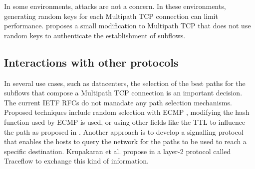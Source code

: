 In some environments, attacks are not a concern. In these environments, generating random keys for each Multipath TCP
connection can limit performance. \cite{draft-paasch-mptcp-lowoverhead} proposes a small modification to Multipath TCP that does not use random keys
to authenticate the establishment of subflows.


\subsection{Interactions with other protocols}

In several use cases, such as datacenters, the selection of the best paths for the subflows that compose a Multipath TCP connection is an important decision. The current IETF RFCs do not manadate any path selection mechanisms. Proposed techniques include random selection with ECMP \cite{Raiciu_Datacenter:2011}, modifying the hash function used by ECMP \cite{Detal_Revisiting:2013} is used, or using other fields like the TTL to influence the path as proposed in \cite{Kabbani_Flowbender:2014}. Another approach is to develop a signalling protocol that enables the hosts to query the network for the paths to be used to reach a specific destination. Krupakaran et al. propose in \cite{Krupakaran_Optimized:2015} a layer-2 protocol called Traceflow to exchange this kind of information.


